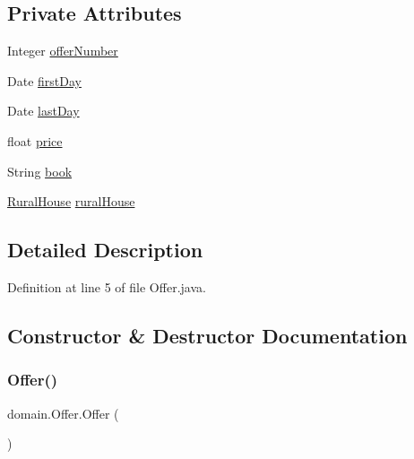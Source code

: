 \subsection*{Private Attributes}
\begin{DoxyCompactItemize}
\item 
Integer \mbox{\hyperlink{classdomain_1_1Offer_af77beec2989adcfb9b7b7ef399f9b363}{offer\+Number}}
\item 
Date \mbox{\hyperlink{classdomain_1_1Offer_ac30c7d7ca38555fecc523259c15bd6b0}{first\+Day}}
\item 
Date \mbox{\hyperlink{classdomain_1_1Offer_a4d415274c0e120dd3e66e4ad46d7e2b2}{last\+Day}}
\item 
float \mbox{\hyperlink{classdomain_1_1Offer_a194cfe9363c5bd9e745f56978b03e7fd}{price}}
\item 
String \mbox{\hyperlink{classdomain_1_1Offer_afea0a91aa8cd1382181dd2071b7c6a04}{book}}
\item 
\mbox{\hyperlink{classdomain_1_1RuralHouse}{Rural\+House}} \mbox{\hyperlink{classdomain_1_1Offer_a122573abd92911b25cde7d7e84f488f5}{rural\+House}}
\end{DoxyCompactItemize}


\subsection{Detailed Description}


Definition at line 5 of file Offer.\+java.



\subsection{Constructor \& Destructor Documentation}
\mbox{\label{classdomain_1_1Offer_ae82665e8df101e5a20b41dc06f74a789}} 
\subsubsection{\texorpdfstring{Offer()}{Offer()}\hspace{0.1cm}{\footnotesize\ttfamily [1/2]}}
{\footnotesize\ttfamily domain.\+Offer.\+Offer (\begin{DoxyParamCaption}{ }\end{DoxyParamCaption})}



